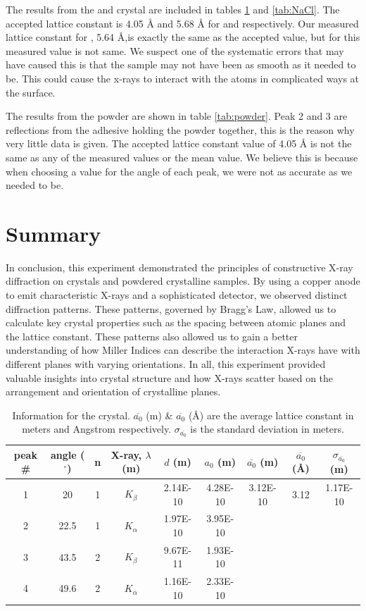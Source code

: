 \documentclass[a4paper,12pt,english]{all-in-one} %
\begin{document}
\begin{multicols}{2}
{The results from the  and  crystal are included in tables \ref{tab:LiF} and \ref{tab:NaCl}. The accepted lattice constant is 4.05 {\AA} and 5.68 {\AA} for  and  respectively. Our measured lattice constant for , 5.64 {\AA},is exactly the same as the accepted value, but for  this measured value is not same. We suspect one of the systematic errors that may have caused this is that the sample may not have been as smooth as it needed to be. This could cause the x-rays to interact with the atoms in complicated ways at the surface. 

The results from the  powder are shown in table \ref{tab:powder}. Peak 2 and 3 are reflections from the adhesive holding the powder together, this is the reason why very little data is given. The accepted lattice constant value of 4.05 {\AA} is not the same as any of the measured values or the mean value. We believe this is because when choosing a value for the angle of each peak, we were not as accurate as we needed to be. 
}


\end{multicols}

\section*{Summary}
{
In conclusion, this experiment demonstrated the principles of constructive X-ray diffraction on crystals and powdered crystalline samples. By using a copper anode to emit characteristic X-rays and a sophisticated detector, we observed distinct diffraction patterns. These patterns, governed by Bragg’s Law, allowed us to calculate key crystal properties such as the spacing between atomic planes and the lattice constant. These patterns also allowed us to gain a better understanding of how Miller Indices can describe the interaction X-rays have with different planes with varying orientations. In all, this experiment provided valuable insights into crystal structure and how X-rays scatter based on the arrangement and orientation of crystalline planes.
}

\begin{table}[]
\centering
\begin{tabular}{c|c|c|c|c|c|c|c|c}
peak \# & angle ($^\circ$) & n & X-ray, $\lambda$ (m) & $d$ (m) & $a_0$ (m) & $\overline{a_0}$ (m) & $\overline{a_0}$ (\AA) & $\sigma_{\overline{a_0}}$ (m) \\ \hline
1 & 20 & 1 & $K_\beta$ & 2.14E-10 & 4.28E-10  & 3.12E-10 & 3.12 & 1.17E-10\\
2 & 22.5 & 1 & $K_\alpha$ & 1.97E-10 & 3.95E-10 \\
3 & 43.5 & 2 & $K_\beta$ & 9.67E-11	& 1.93E-10\\
4 & 49.6 & 2 & $K_\alpha$ & 1.16E-10 & 2.33E-10 \\   
\end{tabular}
\caption{Information for the  crystal. $\overline{a_0}$ (m) \& $\overline{a_0}$ (\AA) are the average lattice constant in meters and Angstrom respectively. $\sigma_{\overline{a_0}}$ is the standard deviation in meters.  }
\label{tab:LiF}
\end{table}
\end{document}
